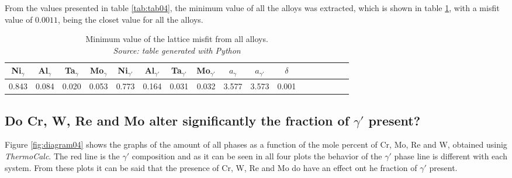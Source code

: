 From the values presented in table \ref{tab:tab04}, the minimum value of all the alloys was extracted, which is shown in table \ref{tab:tab05}, with a misfit value of $0.0011$, being the closet value for all the alloys.

\begin{table}[h]
  \centering
  \begin{tabular}{rrrrrrrrrrrrrrrrr}
    \multicolumn{1}{c}{Ni$_\gamma$} & \multicolumn{1}{c}{Al$_\gamma$} & \multicolumn{1}{c}{Ta$_\gamma$} & \multicolumn{1}{c}{Mo$_\gamma$} & \multicolumn{1}{c}{Ni$_{\gamma'}$} & \multicolumn{1}{c}{Al$_{\gamma'}$} & \multicolumn{1}{c}{Ta$_{\gamma'}$} & \multicolumn{1}{c}{Mo$_{\gamma'}$} & \multicolumn{1}{c}{$a_\gamma$} & \multicolumn{1}{c}{$a_{\gamma'}$} & \multicolumn{1}{c}{$\delta$} \\ \hline \hline
    0.843 & 0.084 & 0.020 & 0.053 & 0.773 & 0.164 & 0.031 & 0.032 & 3.577 & 3.573 & 0.001
  \end{tabular}
  \caption{\centering Minimum value of the lattice misfit from all alloys. \\ 
  \textit{Source: table generated with Python \citep{mygit}}}
  \label{tab:tab05}
\end{table}

\newpage
\subsection{Do Cr, W, Re and Mo alter significantly the fraction of $\gamma'$ present?}

Figure \ref{fig:diagram04} shows the graphs of the amount of all phases as a function of the mole percent of Cr, Mo, Re and W, obtained usinig \textit{ThermoCalc}. The red line is the $\gamma'$ composition and as it can be seen in all four plots the behavior of the $\gamma'$ phase line is different with each system. From these plots it can be said that the presence of Cr, W, Re and Mo do have an effect ont he fraction of $\gamma'$ present.


